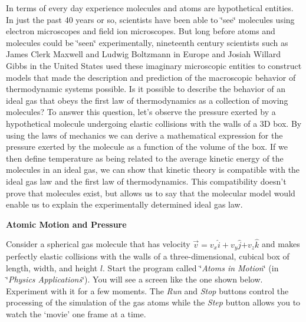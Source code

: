 In terms of every day experience molecules and atoms are hypothetical
entities. In just the past 40 years or so, scientists have been able
to \char`\"{}see\char`\"{} molecules using electron microscopes and
field ion microscopes. But long before atoms and molecules could be
\char`\"{}seen\char`\"{} experimentally, nineteenth century scientists
such as James Clerk Maxwell and Ludwig Boltzmann in Europe and Josiah
Willard Gibbs in the United States used these imaginary microscopic
entities to construct models that made the description and prediction
of the macroscopic behavior of thermodynamic systems possible. Is
it possible to describe the behavior of an ideal gas that obeys the
first law of thermodynamics as a collection of moving molecules? To
answer this question, let's observe the pressure exerted by a hypothetical
molecule undergoing elastic collisions with the walls of a 3D box.
By using the laws of mechanics we can derive a mathematical expression
for the pressure exerted by the molecule as a function of the volume
of the box. If we then define temperature as being related to the
average kinetic energy of the molecules in an ideal gas, we can show
that kinetic theory is compatible with the ideal gas law and the first
law of thermodynamics. This compatibility doesn't prove that molecules
exist, but allows us to say that the molecular model would enable
us to explain the experimentally determined ideal gas law.

\textbf{Atomic Motion and Pressure}

Consider a spherical gas molecule that has velocity 
\( \overrightarrow{v}=v_{x} \)\( \hat{i}+v_{y} \)\( \hat{j} \)\( + v_z\hat k\) and
makes perfectly elastic collisions with the walls of a three-dimensional, cubical
box of length, width, and height $l$. Start the program called \char`\"{}\textit{Atoms
in Motion}\char`\"{} (in \char`\"{}\textit{Physics Applications}\char`\"{}). 
You will see a screen
like the one shown below. Experiment with it for a few moments. 
The {\it Run} and {\it Stop} buttons control the processing of the 
simulation of the gas atoms while the {\it Step} button allows you to watch the
`movie' one frame at a time.

